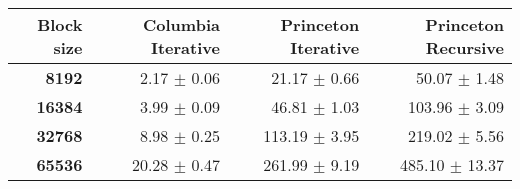 \begin{tabular}{rrrr}\toprule
\textbf{Block size}  & \textbf{Columbia Iterative} & \textbf{Princeton Iterative} & \textbf{Princeton Recursive}\\\midrule
\textbf{8192}  & 2.17 $\pm$ 0.06 & 21.17 $\pm$ 0.66 & 50.07 $\pm$ 1.48\\
\textbf{16384}  & 3.99 $\pm$ 0.09 & 46.81 $\pm$ 1.03 & 103.96 $\pm$ 3.09\\
\textbf{32768}  & 8.98 $\pm$ 0.25 & 113.19 $\pm$ 3.95 & 219.02 $\pm$ 5.56\\
\textbf{65536} & 20.28 $\pm$ 0.47 & 261.99 $\pm$ 9.19 & 485.10 $\pm$ 13.37\\
\bottomrule
\end{tabular}
